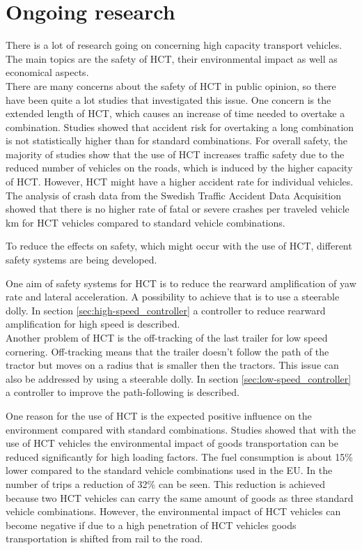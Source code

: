 \documentclass[ExampleMasters.tex]{subfiles}
\begin{document}
\section{Ongoing research}
\label{sec:ongoing_research}
There is a lot of research going on concerning high capacity transport vehicles. The main topics are the safety of \gls{HCT}, their environmental impact as well as economical aspects.\\

There are many concerns about the safety of \gls{HCT} in public opinion, so there have been quite a lot studies that investigated this issue. One concern is the extended length of \gls{HCT}, which causes an increase of time needed to overtake a combination. Studies showed that accident risk for overtaking a long combination is not statistically higher than for standard combinations. \cite{EMS}
For overall safety, the majority of studies show that the use of \gls{HCT} increases traffic safety due to the reduced number of vehicles on the roads, which is induced by the higher capacity of HCT. However, \gls{HCT} might have a higher accident rate for individual vehicles. \cite{EMS}
The analysis of crash data from the Swedish Traffic Accident Data Acquisition showed that there is no higher rate of fatal or severe crashes per traveled vehicle km for \gls{HCT} vehicles compared to standard vehicle combinations. \cite{balint2013correlation}

To reduce the effects on safety, which might occur with the use of \gls{HCT}, different safety systems are being developed.

One aim of safety systems for \gls{HCT} is to reduce the rearward amplification of yaw rate and lateral acceleration. A possibility to achieve that is to use a steerable dolly. In section \ref{sec:high-speed_controller} a controller to reduce rearward amplification for high speed is described.\\
Another problem of \gls{HCT} is the off-tracking of the last trailer for low speed cornering. Off-tracking means that the trailer doesn't follow the path of the tractor but moves on a radius that is smaller then the tractors. This issue can also be addressed by using a steerable dolly. In section \ref{sec:low-speed_controller} a controller to improve the path-following is described.

One reason for the use of \gls{HCT} is the expected positive influence on the environment compared with standard combinations. 
Studies showed that with the use of \gls{HCT} vehicles the environmental impact of goods transportation can be reduced significantly for high loading factors. The fuel consumption is about 15\% lower compared to the standard vehicle combinations used in the EU. In the number of trips a reduction of 32\% can be seen. This reduction is achieved because two \gls{HCT} vehicles can carry the same amount of goods as three standard vehicle combinations.  \cite{backman2002improved}
However, the environmental impact of \gls{HCT} vehicles can become negative if due to a high penetration of \gls{HCT} vehicles goods transportation is shifted from rail to the road. \cite{doll2009long}
\end{document}
